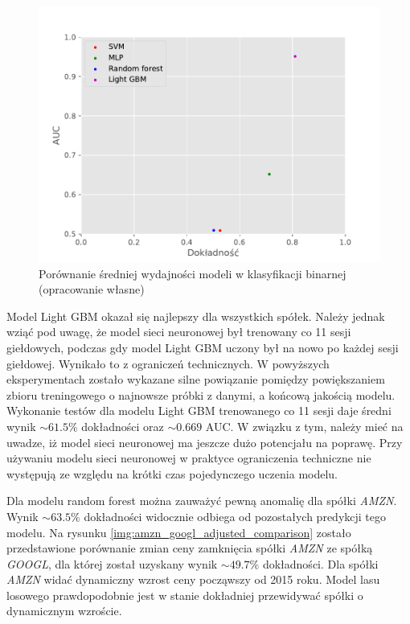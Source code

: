 \documentclass[a4paper, twoside, 11pt, openright]{article}
\begin{document}
\begin{figure}[H]
\centering \includegraphics[scale=0.9]{img/summary-binary-summary.pdf}
\caption{Porównanie średniej wydajności modeli w klasyfikacji binarnej (opracowanie własne)}
\label{img:summary-binary}
\end{figure}

\bigskip

Model Light GBM okazał się najlepszy dla wszystkich spółek. Należy jednak wziąć pod uwagę, że model sieci neuronowej był trenowany co 11 sesji giełdowych, podczas gdy model Light GBM uczony był na nowo po każdej sesji giełdowej. Wynikało to z ograniczeń technicznych. W powyższych eksperymentach zostało wykazane silne powiązanie pomiędzy powiększaniem zbioru treningowego o najnowsze próbki z danymi, a końcową jakością modelu. Wykonanie testów dla modelu Light GBM trenowanego co 11 sesji daje średni wynik $\sim 61.5\%$ dokładności oraz $\sim 0.669$ AUC. W związku z tym, należy mieć na uwadze, iż model sieci neuronowej ma jeszcze dużo potencjału na poprawę. Przy używaniu modelu sieci neuronowej w praktyce ograniczenia techniczne nie występują ze względu na krótki czas pojedynczego uczenia modelu.

\bigskip

Dla modelu random forest można zauważyć pewną anomalię dla spółki \textit{AMZN}. Wynik $\sim 63.5\%$ dokładności widocznie odbiega od pozostałych predykcji tego modelu. Na rysunku \ref{img:amzn_googl_adjusted_comparison} zostało przedstawione porównanie zmian ceny zamknięcia spółki \textit{AMZN} ze spółką \textit{GOOGL}, dla której został uzyskany wynik $\sim 49.7\%$ dokładności. Dla spółki \textit{AMZN} widać dynamiczny wzrost ceny począwszy od 2015 roku. Model lasu losowego prawdopodobnie jest w stanie dokładniej przewidywać spółki o dynamicznym wzroście.
\end{document}

